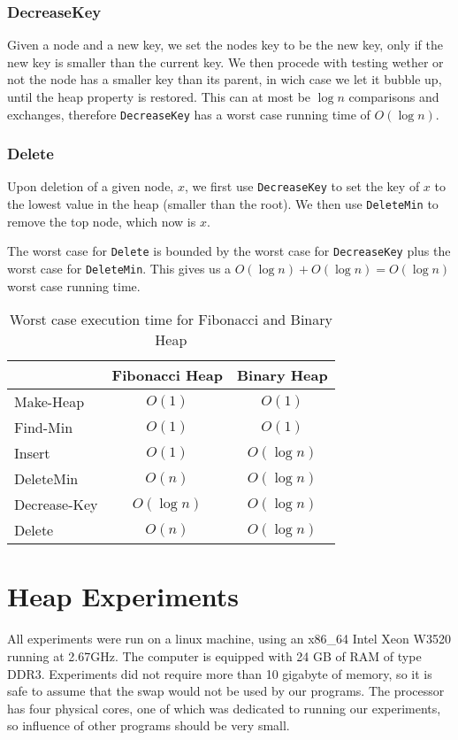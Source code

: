 \documentclass[a4paper,10pt]{article}
\begin{document}
\subsubsection*{DecreaseKey}
Given a node and a new key, we set the nodes key to be the new key, only if the new key is smaller than the current key. We then procede with testing wether or not the node has a smaller key than its parent, in wich case we let it bubble up, until the heap property is restored. This can at most be $\log n$ comparisons and exchanges, therefore \texttt{DecreaseKey} has a worst case running time of $O(\log n)$.
\subsubsection*{Delete}
Upon deletion of a given node, $x$, we first use \texttt{DecreaseKey} to set the key of $x$ to the lowest value in the heap (smaller than the root). We then use \texttt{DeleteMin} to remove the top node, which now is $x$.

The worst case for \texttt{Delete} is bounded by the worst case for \texttt{DecreaseKey} plus the worst case for \texttt{DeleteMin}. This gives us a $O(\log n) + O(\log n) = O(\log n)$ worst case running time.

\begin{table}
  \begin{center}
    \begin{tabular}{l|c|c}
      & Fibonacci Heap & Binary Heap \\
      \hline
      Make-Heap    & $O(1)$             & $O(1)$\\
      Find-Min     & $O(1)$             & $O(1)$\\
      Insert       & $O(1)$             & $O(\log n)$\\
      DeleteMin   & $O(n)$             & $O(\log n)$\\
      Decrease-Key & $O(\log n)$        & $O(\log n)$\\
      Delete       & $O(n)$             & $O(\log n)$
    \end{tabular}
    \caption{Worst case execution time for Fibonacci and Binary Heap}
    \label{worst-case-analysis}
  \end{center}
\end{table}


\section{Heap Experiments}
All experiments were run on a linux machine, using an x86\_64 Intel Xeon W3520 running at 2.67GHz. The computer is equipped with 24 GB of RAM of type DDR3. Experiments did not require more than 10 gigabyte of memory, so it is safe to assume that the swap would not be used by our programs. The processor has four physical cores, one of which was dedicated to running our experiments, so influence of other programs should be very small.
\end{document}
